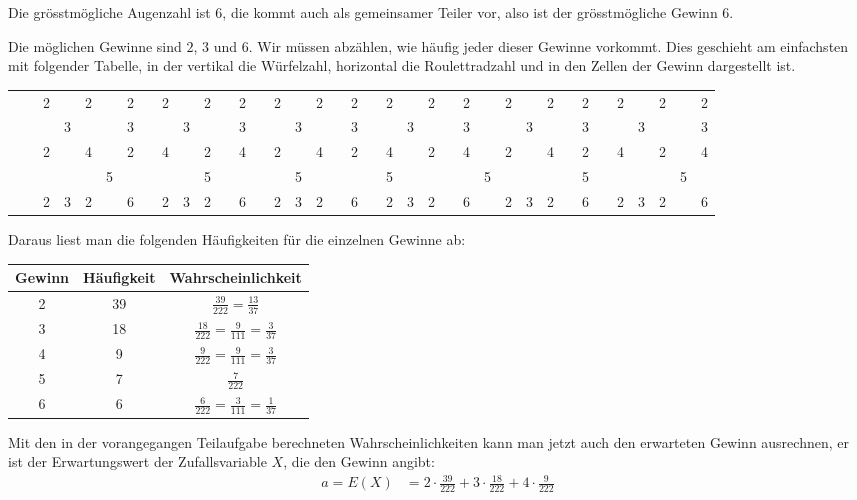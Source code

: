 \begin{loesung}
\begin{teilaufgaben}
\item
Die grösstmögliche Augenzahl ist $6$, die kommt auch als gemeinsamer
Teiler vor, also ist  der grösstmögliche Gewinn $6$.
\item
Die möglichen Gewinne sind $2$, $3$ und $6$. Wir müssen abzählen,
wie häufig jeder dieser Gewinne vorkommt. Dies geschieht am einfachsten
mit folgender Tabelle, in der vertikal die Würfelzahl, horizontal die
Roulettradzahl und in den Zellen der Gewinn dargestellt ist.
\begin{center}
\begin{tabular}{|c|c|c|c|c|c|c|c|c|c|c|c|c|c|c|c|c|c|c|c|c|c|c|c|c|c|c|c|c|c|c|c|c|c|c|c|c|}
\hline
&&&&&&&&&&&&&&&&&&&&&&&&&&&&&&&&&&&&\\
\hline
&&2&&2&&2&&2&&2&&2&&2&&2&&2&&2&&2&&2&&2&&2&&2&&2&&2&&2\\
\hline
&&&3&&&3&&&3&&&3&&&3&&&3&&&3&&&3&&&3&&&3&&&3&&&3\\
\hline
&&2&&4&&2&&4&&2&&4&&2&&4&&2&&4&&2&&4&&2&&4&&2&&4&&2&&4\\
\hline
&&&&&5&&&&&5&&&&&5&&&&&5&&&&&5&&&&&5&&&&&5&\\
\hline
&&2&3&2&&6&&2&3&2&&6&&2&3&2&&6&&2&3&2&&6&&2&3&2&&6&&2&3&2&&6\\
\hline
\end{tabular}
\end{center}
Daraus liest man die folgenden Häufigkeiten für die einzelnen
Gewinne ab:
\begin{center}
\begin {tabular}{|c|c|c|}
\hline
Gewinn&Häufigkeit&Wahrscheinlichkeit\\
\hline
2&39&$\frac{39}{222}=\frac{13}{37}$\\
3&18&$\frac{18}{222}=\frac9{111}=\frac3{37}$\\
4&9&$\frac{9}{222}=\frac9{111}=\frac3{37}$\\
5&7&$\frac7{222}$\\
6&6&$\frac{6}{222}=\frac3{111}=\frac1{37}$\\
\hline
\end {tabular}
\end{center}
\item Mit den in der vorangegangen Teilaufgabe berechneten Wahrscheinlichkeiten
kann man jetzt auch den erwarteten Gewinn ausrechnen, er ist der
Erwartungswert der Zufallsvariable $X$, die den Gewinn angibt:
\begin{align*}
a=E(X)&=2\cdot \frac{39}{222}+3\cdot\frac{18}{222}+4\cdot\frac{9}{222}

\end{align*}
\end{teilaufgaben}
\end{loesung}
